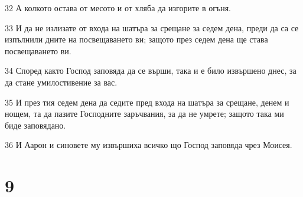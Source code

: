 \par 32 А колкото остава от месото и от хляба да изгорите в огъня.
\par 33 И да не излизате от входа на шатъра за срещане за седем дена, преди да са се изпълнили дните на посвещаването ви; защото през седем дена ще става посвещаването ви.
\par 34 Според както Господ заповяда да се върши, така и е било извършено днес, за да стане умилостивение за вас.
\par 35 И през тия седем дена да седите пред входа на шатъра за срещане, денем и нощем, та да пазите Господните заръчвания, за да не умрете; защото така ми биде заповядано.
\par 36 И Аарон и синовете му извършиха всичко що Господ заповяда чрез Моисея.

\chapter{9}

